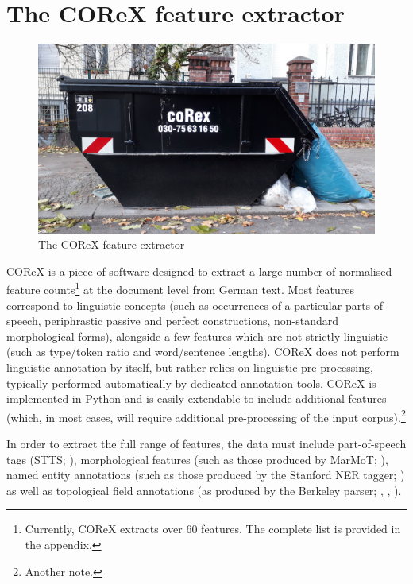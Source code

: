 \section{The COReX feature extractor}

\begin{figure}
  \includegraphics[scale=.3]{corexcontainer.jpg}
  \caption{The COReX feature extractor}  
\end{figure}



COReX is a piece of software designed to extract a large number of normalised feature counts\footnote{Currently, COReX extracts over 60 features. The complete list is provided in the appendix.} at the document level from German text. Most features correspond to linguistic concepts (such as occurrences of a particular parts-of-speech, periphrastic passive and perfect constructions, non-standard morphological forms), alongside a few features which are not strictly linguistic (such as type/token ratio and word/sentence lengths). 
COReX does not perform linguistic annotation by itself, but rather relies on linguistic pre-processing, typically performed automatically by dedicated annotation tools.
COReX is implemented in Python and is easily extendable to include additional features (which, in most cases, will require additional pre-processing of the input corpus).\footnote{Another note.}

In order to extract the full range of features, the data must include part-of-speech tags (STTS; \citealp{Schiller-ea1999}), morphological features (such as those produced by MarMoT; \citealp{MuellerSchmidSchuetze2013}), named entity annotations (such as those produced by the Stanford NER tagger; \citealp{FinkelGrenagerManning2005}) as well as topological field annotations (as produced by the Berkeley parser; \cite{PetrovKlein2007}, \cite{CheungPenn2009}, \cite{Telljohann-ea2012}).

